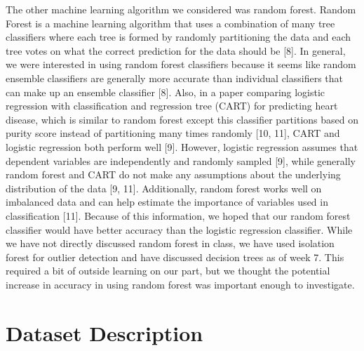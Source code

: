 \documentclass[12pt]{article}
\begin{document}
	The other machine learning algorithm we considered was random forest. Random Forest is a machine learning algorithm that uses a combination of many tree classifiers where each tree is formed by randomly partitioning the data and each tree votes on what the correct prediction for the data should be [8]. In general, we were interested in using random forest classifiers because it seems like random ensemble classifiers are generally more accurate than individual classifiers that can make up an ensemble classifier [8]. Also, in a paper comparing logistic regression with classification and regression tree (CART) for predicting heart disease, which is similar to random forest except this classifier partitions based on purity score instead of partitioning many times randomly [10, 11], CART and logistic regression both perform well [9]. However, logistic regression assumes that dependent variables are independently and randomly sampled [9], while generally random forest and CART do not make any assumptions about the underlying distribution of the data [9, 11]. Additionally, random forest works well on imbalanced data and can help estimate the importance of variables used in classification [11]. Because of this information, we hoped that our random forest classifier would have better accuracy than the logistic regression classifier. While we have not directly discussed random forest in class, we have used isolation forest for outlier detection and have discussed decision trees as of week 7. This required a bit of outside learning on our part, but we thought the potential increase in accuracy in using random forest was important enough to investigate.

\section*{Dataset Description}
\end{document}

